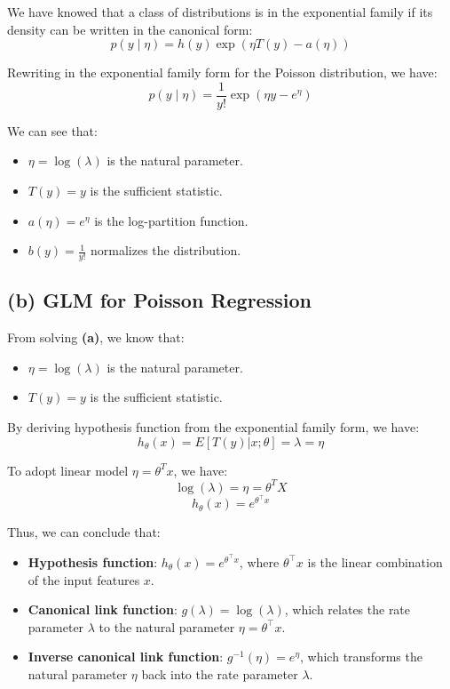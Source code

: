 \documentclass[12pt]{article}
\begin{document}
We have knowed that a class of distributions is in the exponential family if its density can be
written in the canonical form:
\[
p(y \mid \eta) = h(y) \exp\left( \eta T(y) - a(\eta) \right)
\]

Rewriting in the exponential family form for the Poisson distribution, we have:
\[
p(y \mid \eta) = \frac{1}{y!} \exp\left( \eta y - e^{\eta} \right)
\]

We can see that:

\begin{itemize}
    \item \( \eta = \log(\lambda) \) is the natural parameter.
    \item \( T(y) = y \) is the sufficient statistic.
    \item \( a(\eta) = e^{\eta} \) is the log-partition function.
    \item \( b(y) = \frac{1}{y!} \) normalizes the distribution.
\end{itemize}

\subsection*{(b) GLM for Poisson Regression}
From solving \textbf{(a)}, we know that:  

\begin{itemize}
    \item \( \eta = \log(\lambda) \) is the natural parameter.
    \item \( T(y) = y \) is the sufficient statistic.
\end{itemize}

By deriving hypothesis function from the exponential family form, we have:
\[
h_\theta(x) = E[T(y)|x; \theta]= \lambda = \eta
\]

To adopt linear model \(\eta = \theta^T x\), we have:
\[
    \log (\lambda) = \eta = \theta^T X
\]
\[
    h_\theta(x) = e^{\theta^\top x}
\]

Thus, we can conclude that:
\begin{itemize}
    \item \textbf{Hypothesis function}: \( h_\theta(x) = e^{\theta^\top x} \), where \( \theta^\top x \) is the linear combination of the input features \( x \).
    \item \textbf{Canonical link function}: \( g(\lambda) = \log(\lambda) \), which relates the rate parameter \( \lambda \) to the natural parameter \( \eta = \theta^\top x \).
    \item \textbf{Inverse canonical link function}: \( g^{-1}(\eta) = e^{\eta} \), which transforms the natural parameter \( \eta \) back into the rate parameter \( \lambda \).
\end{itemize}
\end{document}
